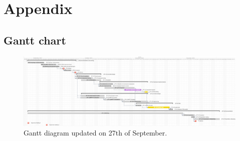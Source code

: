 \chapter{Appendix}

\begin{landscape}


\section{Gantt chart}


\vspace{2cm}
\begin{figure}[htbp]
	\begin{center}
		\includegraphics[trim = {0 0cm 0 0cm}, clip, width=1.6\textwidth]{../Pictures/Gantt_diagram_without_left_panel}
		\caption{Gantt diagram updated on 27th of September.}
		\label{gantt}
	\end{center}	
\end{figure}

\end{landscape}



